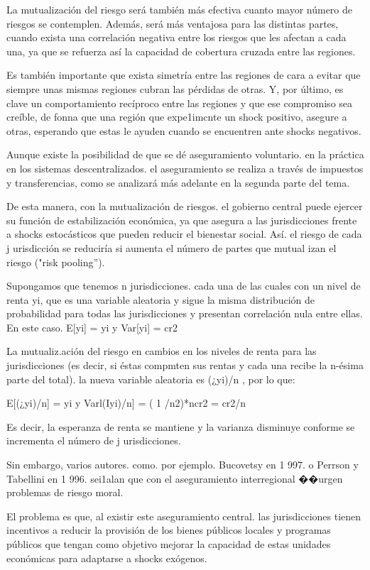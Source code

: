 \documentclass[10pt,a4paper]{article}
\begin{document}
La mutualización del riesgo será también más efectiva cuanto mayor número de riesgos se contemplen. Además, será más ventajosa para las distintas partes, cuando exista una correlación negativa entre los riesgos que les afectan a cada una, ya que se refuerza así la capacidad de cobertura cruzada entre las regiones.

Es también importante que exista simetría entre las regiones de cara a evitar que siempre unas mismas regiones cubran las pérdidas de otras. Y, por último, es clave un comportamiento recíproco entre las regiones y que ese compromiso sea creíble, de fonna que una región que expe1imcnte un shock positivo, asegure a otras, esperando que estas le ayuden cuando se encuentren ante shocks negativos.

Aunque existe la posibilidad de que se dé aseguramiento voluntario. en la práctica en los sistemas descentralizados. el aseguramiento se realiza a través de impuestos y transferencias, como se analizará más adelante en la segunda parte del tema. 

De esta manera, con la mutualización de riesgos. el gobierno central puede ejercer su función de estabilización económica, ya que asegura a las jurisdicciones frente a shocks estocásticos que pueden reducir el bienestar social. Así. el riesgo de cada j urisdicción se reduciría si aumenta el número de partes que mutual izan el riesgo ("risk pooling'').

Supongamos que tenemos n jurisdicciones. cada una de las cuales con un nivel de renta yi, que es una variable aleatoria y sigue la misma distribución de probabilidad para todas las jurisdicciones y presentan correlación nula entre ellas. En este caso. E[yi] = yi y Var[yi] = cr2

La mutualiz.ación del riesgo en cambios en los niveles de renta para las jurisdicciones (es decir, si éstas compmten sus rentas y cada una recibe la n-ésima parte del total). la nueva variable aleatoria es (¿yi)/n , por lo que:

E[(¿yi)/n] = yi y Varl(Iyi)/n] = ( 1 /n2)*ncr2 = cr2/n

Es decir, la esperanza de renta se mantiene y la varianza disminuye conforme se incrementa el número de j urisdicciones.

Sin embargo, varios autores. como. por ejemplo. Bucovetsy en 1 997. o Perrson y Tabellini en 1 996. sei1alan que con el aseguramiento interregional ��urgen problemas de riesgo moral.

El problema es que, al existir este aseguramiento central. las jurisdicciones tienen incentivos a reducir la provisión de los bienes públicos locales y programas públicos que tengan como objetivo mejorar la capacidad de estas unidades económicas para adaptarse a shocks exógenos.
\end{document}
